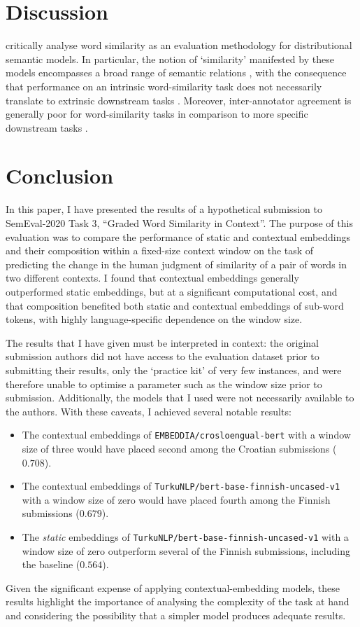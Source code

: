 \section{Discussion}

\textcite{Batchkarov2016} critically analyse word similarity as an evaluation
methodology for distributional semantic models.
In particular, the notion of `similarity' manifested by these models encompasses a
broad range of semantic relations \parencite[e.g.,][2]{Pado2003}, with the consequence
that performance on an intrinsic word-similarity task does not necessarily translate
to extrinsic downstream tasks \parencite[7-8]{Batchkarov2016}.
Moreover, inter-annotator agreement is generally poor for word-similarity tasks in
comparison to more specific downstream tasks \parencite[8-9]{Batchkarov2016}.

\section{Conclusion}

In this paper, I have presented the results of a hypothetical submission to SemEval-2020
Task 3, ``Graded Word Similarity in Context''.
The purpose of this evaluation was to compare the performance of static and contextual
embeddings and their composition within a fixed-size context window on the task of
predicting the change in the human judgment of similarity of a pair of words in two
different contexts.
I found that contextual embeddings generally outperformed static embeddings, but at a
significant computational cost, and that composition benefited both static and
contextual embeddings of sub-word tokens, with highly language-specific dependence
on the window size.

The results that I have given must be interpreted in context: the original submission
authors did not have access to the evaluation dataset prior to submitting their results,
only the `practice kit' of very few instances, and were therefore unable to optimise a
parameter such as the window size prior to submission.
Additionally, the models that I used were not necessarily available to the authors.
With these caveats, I achieved several notable results:
\begin{itemize}
  \item The contextual embeddings of \texttt{EMBEDDIA/crosloengual-bert} with a window
        size of three would have placed second among the Croatian submissions
        ($0.708$).
  \item The contextual embeddings of \texttt{TurkuNLP/bert-base-finnish-uncased-v1} with
        a window size of zero would have placed fourth among the Finnish submissions
        ($0.679$).
  \item The \emph{static} embeddings of \texttt{TurkuNLP/bert-base-finnish-uncased-v1}
        with a window size of zero outperform several of the Finnish submissions,
        including the baseline ($0.564$).
\end{itemize}
Given the significant expense of applying contextual-embedding models, these results
highlight the importance of analysing the complexity of the task at hand and considering
the possibility that a simpler model produces adequate results.